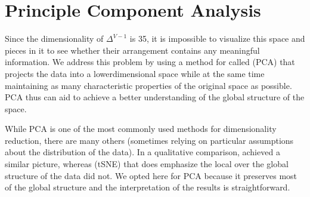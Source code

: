 \documentclass[letterpaper,10pt,english]{sphinxmanual}
\begin{document}
\section{Principle Component Analysis}
\label{\detokenize{tonality:principle-component-analysis}}
Since the dimensionality of \(\Delta^{V-1}\) is 35, it is impossible to visualize
this space and pieces in it to see whether their arrangement contains any meaningful information.
We address this problem by using a method for 
called  (PCA) 
that projects the data into a lower\sphinxhyphen{}dimensional space while at the same time maintaining
as many characteristic properties of the original space as possible.
PCA thus can aid to achieve a better understanding of
the global structure of the space. %
\begin{footnote}[1]\sphinxAtStartFootnote
While PCA is one of the most commonly used methods for dimensionality reduction, there are many others
(sometimes relying on particular assumptions about the distribution of the data).
In a qualitative comparison,   achieved a similar picture,
whereas  (t\sphinxhyphen{}SNE) 
that does emphasize the local over the global structure of the data did not.
We opted here for PCA because it preserves most
of the global structure and the interpretation of the results is straight\sphinxhyphen{}forward.
%
\end{footnote}
\end{document}
